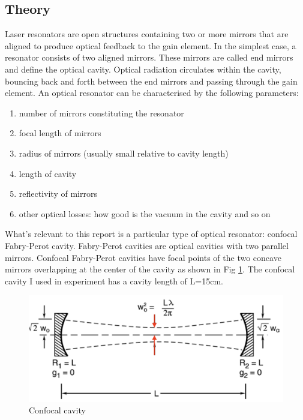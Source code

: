 \documentclass[12pt]{report}
\begin{document}
\subsection{Theory}
Laser resonators are open structures containing two or more mirrors that are aligned to produce optical feedback to the gain element. In the simplest case, a resonator consists of two aligned mirrors. These mirrors are called end mirrors and define the optical cavity. Optical radiation circulates within the cavity, bouncing back and forth between the end mirrors and passing through the gain element. An optical resonator can be characterised by the following parameters: 
\begin{enumerate}
    \item number of mirrors constituting the resonator
    \item focal length of mirrors
    \item radius of mirrors (usually small relative to cavity length)
    \item length of cavity
    \item reflectivity of mirrors
    \item other optical losses: how good is the vacuum in the cavity and so on
\end{enumerate}
What's relevant to this report is a particular type of optical resonator: confocal Fabry-Perot cavity. Fabry-Perot cavities are optical cavities with two parallel mirrors. Confocal Fabry-Perot cavities have focal points of the two concave mirrors overlapping at the center of the cavity as shown in Fig \ref{fig:confocalCavity}. The confocal cavity I used in experiment has a cavity length of L=15cm. 

\begin{figure}[H]
    \centering
    \includegraphics[width = .8\textwidth]{confocalCavity.png}
    \caption{Confocal cavity}
    \label{fig:confocalCavity}
\end{figure}
\end{document}
